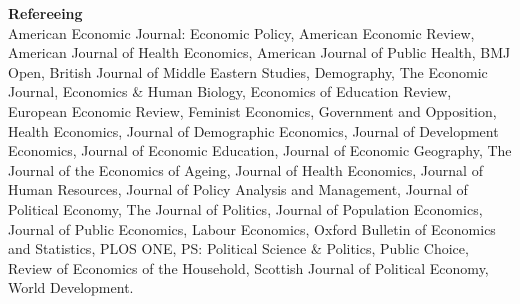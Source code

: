 \documentclass[12pt]{article}
\begin{document}
\vspace{0.3cm}
\noindent\textbf{Refereeing}\\[5pt]
\noindent American Economic Journal: Economic Policy, American Economic Review, American Journal of Health Economics, American Journal of Public Health, BMJ Open, British Journal of Middle Eastern Studies, Demography, The Economic Journal, Economics \& Human Biology, Economics of Education Review, European Economic Review, Feminist Economics, Government and Opposition, Health Economics, Journal of Demographic Economics, Journal of Development Economics, Journal of Economic Education, Journal of Economic Geography, The Journal of the Economics of Ageing, Journal of Health Economics, Journal of Human Resources, Journal of Policy Analysis and Management, Journal of Political Economy, The Journal of Politics, Journal of Population Economics, Journal of Public Economics, Labour Economics, Oxford Bulletin of Economics and Statistics, PLOS ONE, PS: Political Science \& Politics, Public Choice, Review of Economics of the Household, Scottish Journal of Political Economy, World Development.
\end{document}
